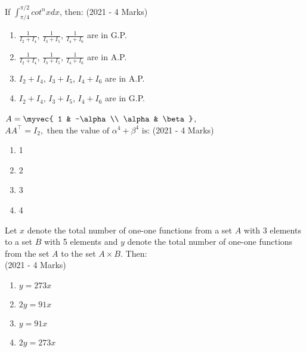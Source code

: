     \item{
     
            If $\int_{\pi/4}^{\pi/2}cot^nx dx$, then:\hfill
                {(2021 - 4 Marks)}
            \begin{multicols}{2}
                \begin{enumerate}
                    \item $\frac{1}{I_2 + I_4}$, $\frac{1}{I_3 + I_5}$, $\frac{1}{I_4 + I_6}$ are in G.P.
                    
                    \item $\frac{1}{I_2 + I_4}$, $\frac{1}{I_3 + I_5}$, $\frac{1}{I_4 + I_6}$ are in A.P.
                    
                    \item $I_2 + I_4$, $I_3 + I_5$, $I_4 + I_6$ are in A.P.
                    
                    \item $I_2 + I_4$, $I_3 + I_5$, $I_4 + I_6$ are in G.P.
                \end{enumerate}
            \end{multicols}
        
        }
    \item{
            $A = \myvec{ 1 & -\alpha \\ \alpha & \beta}$, $ AA^\top = I_2, \text{ then the value of } \alpha^4 + \beta^4 \text{ is:} $
           	\hfill
                {(2021 - 4 Marks)}
            
            \begin{multicols}{4}
				\begin{enumerate}
					\item 1
					\item 2
					\item 3
					\item 4
				\end{enumerate}
			\end{multicols}
        
        }
 	\item{
        	Let $x$ denote the total number of one-one functions from a set $A$ with 3 elements to a set $B$ with 5 elements and $y$ denote the total number of one-one functions from the set $A$ to the set $A \times B$. Then:\\ \text{ }
        	\hfill
        	{(2021 - 4 Marks)}
        	
        	\begin{multicols}{4}
        		\begin{enumerate}
					\item $y = 273x$
					
					\item $2y = 91x$
					
					\item $y = 91x$
					
					\item $2y = 273x$
        		\end{enumerate}
        	\end{multicols}
        	
        }
